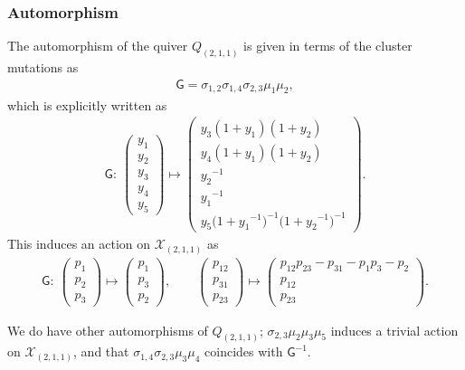 \documentclass[10pt,a4paper]{amsart}
\numberwithin{equation}{section}
\begin{document}
\subsubsection*{Automorphism}
The automorphism of the quiver $Q_{(2,1,1)}$ is given in terms of the cluster mutations as
\begin{gather} \label{G_211}
 \mathsf{G} = \sigma_{1,2} \sigma_{1,4} \sigma_{2,3} \mu_1 \mu_2 ,
\end{gather}
which is explicitly written as
\begin{gather*}
 \mathsf{G} \colon \
 \begin{pmatrix}
 y_1 \\ y_2 \\ y_3 \\ y_4 \\ y_5
 \end{pmatrix}
 \mapsto
 \begin{pmatrix}
 y_3 (1+y_1 ) ( 1+ y_2 ) \\
 y_4(1+y_1) ( 1+ y_2 ) \\
 {y_2}^{-1} \\
 {y_1}^{-1} \\
 y_5 \big(1+{y_1}^{-1} \big)^{-1} \big( 1+ {y_2}^{-1} \big)^{-1}
 \end{pmatrix} .
\end{gather*}
This induces an action on $\mathcal{X}_{(2,1,1)}$ as
\begin{gather*}
 \mathsf{G}\colon \
 \begin{pmatrix}
 p_1 \\ p_2 \\ p_3
 \end{pmatrix}
 \mapsto
 \begin{pmatrix}
 p_1 \\ p_3 \\ p_2
 \end{pmatrix},
 \qquad
 \begin{pmatrix}
 p_{12} \\ p_{31} \\ p_{23}
 \end{pmatrix}
 \mapsto
 \begin{pmatrix}
 p_{12} p_{23} - p_{31} - p_1 p_3 - p_2 \\
 p_{12} \\
 p_{23}
 \end{pmatrix} .
\end{gather*}

We do have other automorphisms of $Q_{(2,1,1)}$; $\sigma_{2,3} \mu_2 \mu_3 \mu_5$ induces a trivial action on $\mathcal{X}_{(2,1,1)}$, and that $\sigma_{1,4} \sigma_{2,3} \mu_3 \mu_4$ coincides with ${\mathsf{G}}^{-1}$.
\end{document}
